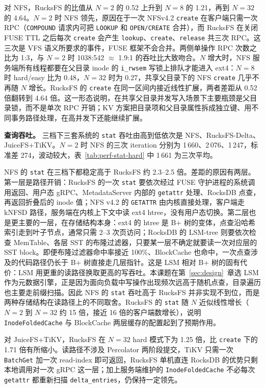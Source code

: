 对 NFS，RucksFS 的比值从 $N=2$ 的 0.52 上升到 $N=8$ 的 1.21，再到 $N=32$ 的 4.64。$N=2$ 时 NFS 领先，原因在于一次 NFSv4.2 \texttt{create} 在客户端只需一次 RPC（\texttt{COMPOUND} 请求内可把 \texttt{LOOKUP} 和 \texttt{OPEN/CREATE} 合并），而 RucksFS 在关闭 FUSE TTL 之后每次 \texttt{create} 会产生 \texttt{lookup}、\texttt{create}、\texttt{release} 共三次 RPC。这三次是 VFS 语义所要求的事件，FUSE 框架不会合并。两侧单操作 RPC 次数之比为 1:3，与 $N=2$ 时 1038:542 $\approx$ 1.9:1 的吞吐比大致吻合。$N$ 增大时，NFS 服务端所有线程都要在父目录 inode 的 \texttt{i\_rwsem} 写锁上排队才能进入 ext4：$N=8$ 时 hard/easy 比为 0.48，$N=32$ 时为 0.27，共享父目录下的 NFS \texttt{create} 几乎不再随 $N$ 增长。RucksFS 的 \texttt{create} 在同一区间内接近线性扩展，两者差距从 0.52 倍翻转到 4.64 倍。这一形态说明，在共享父目录并发写入场景下主要瓶颈是父目录锁，而不是单次 RPC 开销；KV 方案把目录项和父目录属性拆成独立键、用不同事务路径处理，在高并发下还能继续扩展。

\textbf{查询吞吐。} 三档下三套系统的 \texttt{stat} 吞吐由高到低依次是 NFS、RucksFS-Delta、JuiceFS+TiKV。$N=2$ 时 NFS 的三次 iteration 分别为 1\,660、2\,076、1\,247，标准差 274，波动较大，表~\ref{tab:perf-stat-hard} 中 1\,661 为三次平均。

NFS 的 \texttt{stat} 在三档下都稳定高于 RucksFS 约 2.3--2.5 倍。差距的原因有两层。第一层是路径开销：RucksFS 的一次 \texttt{stat} 要依次经过 FUSE 守护进程的系统调用返回、用户态 gRPC、MetadataServer 内部的 \texttt{getattr} 处理、RocksDB 点查，再返回折叠后的 inode 值；NFS v4.2 的 \texttt{GETATTR} 由内核直接处理，客户端走 kNFSD 路径，服务端在内核上下文中读 ext4 htree，没有用户态切换。第二层也是更主要的一层，在存储结构本身：ext4 的 htree 是 B+ 树的变体，点查沿哈希索引走到叶子节点，通常只需 2--3 次页访问；RocksDB 的 LSM-tree 则要依次检查 MemTable、各层 SST 的布隆过滤器，只要某一层不确定就要读一次对应层的 SST block。即便布隆过滤器命中率接近 100\%、BlockCache 也命中，一次点查涉及的代码路径仍长于 B+ 树直接走几层指针。这是 LSM 相对 B+ 树的固有代价：LSM 用更重的读路径换取更高的写吞吐。本课题在第~\ref{sec:design}~章选 LSM 作为元数据引擎，正是因为面向负载中写操作出现频次远高于随机点查，目录遍历也主要走前缀扫描。因此 NFS 的 \texttt{stat} 吞吐高于 RucksFS 并非实现不到位，而是两种存储结构在读路径上的不同取舍。RucksFS 的 \texttt{stat} 随 $N$ 近似线性增长（$N=2$ 到 $N=32$ 约 15 倍，接近 16 倍的客户端数增长），说明 \texttt{InodeFoldedCache} 与 BlockCache 两层缓存的配置起到了预期作用。

对 JuiceFS+TiKV，RucksFS 在 $N=32$ hard 模式下为 1.25 倍，比 \texttt{create} 下的 1.71 倍有所缩小。读路径不涉及 Percolator 两阶段提交，TiKV 只需一次 \texttt{BatchGet} 加一次 read-index 即可返回，RucksFS 单机直连 RocksDB 的优势只剩本地调用对一次 gRPC 这一层；加上服务端维护的 \texttt{InodeFoldedCache} 不必每次 \texttt{getattr} 都重新扫描 \texttt{delta\_entries}，仍保持一定领先。

